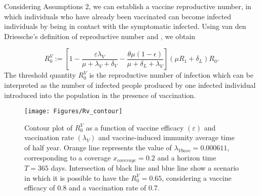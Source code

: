 
%
%
Considering Assumptions 2, we can establish a vaccine reproductive number,
in which individuals who have already been vaccinated
can become infected individuals by being in contact with the
symptomatic infected. Using van den Driessche’s \cite{VandenDriessche2017a}
definition of reproductive number and \cite{Alexander2004}, we obtain

\begin{equation*}
 R_{0}^V := \left[ 1-\frac{\varepsilon \lambda_V}
 {\mu+\lambda_V+\delta_V}
 -\frac{\theta\mu(1-\epsilon)}{\mu+\delta_L+\lambda_V}\right]
 (\mu R_1+\delta_L)R_0.
\end{equation*}
%
The threshold quantity $R_0^V$ is the reproductive number of infection
which can be interpreted as the number of infected people produced
by one infected individual introduced into the population in the
presence of vaccination.

\begin{figure*}[tbh]
    \centering
      \texttt{[image: Figures/Rv\_contour]}
    \caption{
    Contour plot  of $R_0^V$ as a function of vaccine efficacy $( \varepsilon) $ and
    vaccination rate $(\lambda_V)$ and vaccine-induced immunity average time of half year.
    Orange line represents the value of $\lambda_{Vbase}=\num{0.000611}$, corresponding to a
    coverage $x_{coverage} = \num{0.2}$ and a horizon time $T=\num{365}$ days. 
    Intersection of black line and blue line show a scenario in which it is
        possible to have the $R_0^V=0.65$, considering a vaccine efficacy of 
        \num{0.8} and a vaccination rate 
        of \num{0.7}.}
    \label{fig:rvcontour1}
\end{figure*}

